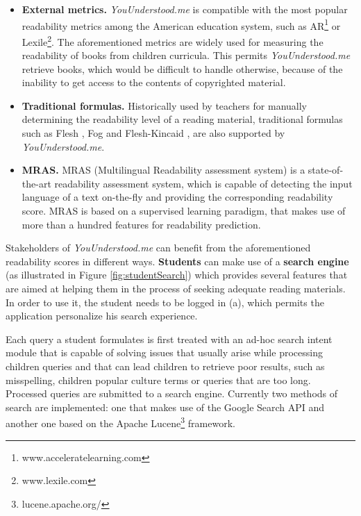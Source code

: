 \documentclass{sig-alternate-05-2015}
\begin{document}
\begin{itemize}
\item \textbf{External metrics.} \textit{YouUnderstood.me} is compatible with the most popular readability metrics among the American education system, such as AR\footnote{www.acceleratelearning.com} or Lexile\footnote{www.lexile.com}. The aforementioned metrics are widely used for measuring the readability of books from children curricula. This permits \textit{YouUnderstood.me} retrieve books, which would be difficult to handle otherwise, because of the inability to get access to the contents of copyrighted material.
\item \textbf{Traditional formulas.} Historically used by teachers for manually determining the readability level of a reading material, traditional formulas such as Flesh \cite{flesch1948new}, Fog\cite{gunning1952technique} and Flesh-Kincaid \cite{flesch1948new}, are also supported by \textit{YouUnderstood.me}. 
\item \textbf{MRAS.} MRAS (Multilingual Readability assessment system)\cite{imadrazo2016readability} is a state-of-the-art readability assessment system, which is capable of detecting the input language of a text on-the-fly and providing the corresponding readability score. MRAS is based on a supervised learning paradigm, that makes use of more than a hundred features for readability prediction. 



\end{itemize}

Stakeholders of \textit{YouUnderstood.me} can benefit from the aforementioned readability scores in different ways. \textbf{Students} can make use of a \textbf{search engine} (as illustrated in Figure \ref{fig:studentSearch}) which provides several features that are aimed at helping them in the process of seeking adequate reading materials. In order to use it, the student needs to be logged in (a), which permits the application personalize his search experience.

Each query a student formulates is first treated with an ad-hoc search intent module that is capable of solving issues that usually arise while processing children queries and that can lead children to retrieve poor results, such as misspelling, children popular culture terms or queries that are too long. Processed queries are submitted to a search engine. Currently two methods of search are implemented: one that makes use of the Google Search API and another one based on the Apache Lucene\footnote{lucene.apache.org/} framework.
\end{document}

